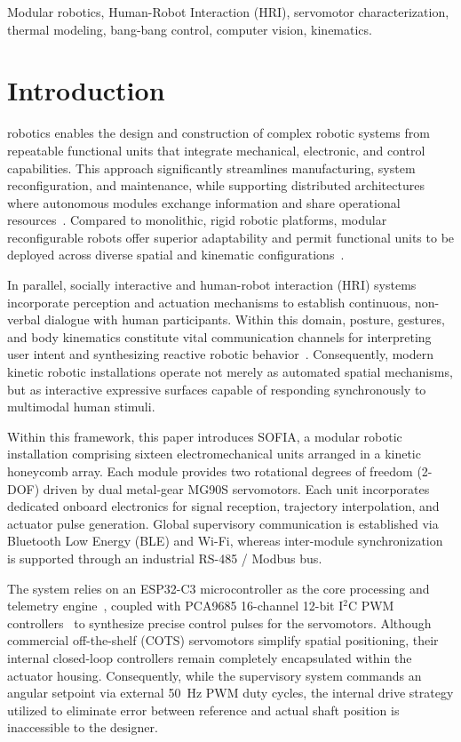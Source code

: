 \documentclass[lettersize,journal]{IEEEtran}
\begin{document}
\begin{IEEEkeywords}
Modular robotics, Human-Robot Interaction (HRI), servomotor characterization, thermal modeling, bang-bang control, computer vision, kinematics.
\end{IEEEkeywords}

\section{Introduction}
\label{sec:introduction}

 robotics enables the design and construction of complex robotic systems from repeatable functional units that integrate mechanical, electronic, and control capabilities. This approach significantly streamlines manufacturing, system reconfiguration, and maintenance, while supporting distributed architectures where autonomous modules exchange information and share operational resources~\cite{seo2019modular}. Compared to monolithic, rigid robotic platforms, modular reconfigurable robots offer superior adaptability and permit functional units to be deployed across diverse spatial and kinematic configurations~\cite{seo2019modular}.

In parallel, socially interactive and human-robot interaction (HRI) systems incorporate perception and actuation mechanisms to establish continuous, non-verbal dialogue with human participants. Within this domain, posture, gestures, and body kinematics constitute vital communication channels for interpreting user intent and synthesizing reactive robotic behavior~\cite{fong2003social}. Consequently, modern kinetic robotic installations operate not merely as automated spatial mechanisms, but as interactive expressive surfaces capable of responding synchronously to multimodal human stimuli.

Within this framework, this paper introduces SOFIA, a modular robotic installation comprising sixteen electromechanical units arranged in a kinetic honeycomb array. Each module provides two rotational degrees of freedom (2-DOF) driven by dual metal-gear MG90S servomotors. Each unit incorporates dedicated onboard electronics for signal reception, trajectory interpolation, and actuator pulse generation. Global supervisory communication is established via Bluetooth Low Energy (BLE) and Wi-Fi, whereas inter-module synchronization is supported through an industrial RS-485 / Modbus bus.

The system relies on an ESP32-C3 microcontroller as the core processing and telemetry engine~\cite{espressif2024esp32c3}, coupled with PCA9685 16-channel 12-bit I$^2$C PWM controllers~\cite{nxp2024pca9685} to synthesize precise control pulses for the servomotors. Although commercial off-the-shelf (COTS) servomotors simplify spatial positioning, their internal closed-loop controllers remain completely encapsulated within the actuator housing. Consequently, while the supervisory system commands an angular setpoint via external 50~Hz PWM duty cycles, the internal drive strategy utilized to eliminate error between reference and actual shaft position is inaccessible to the designer.
\end{document}
